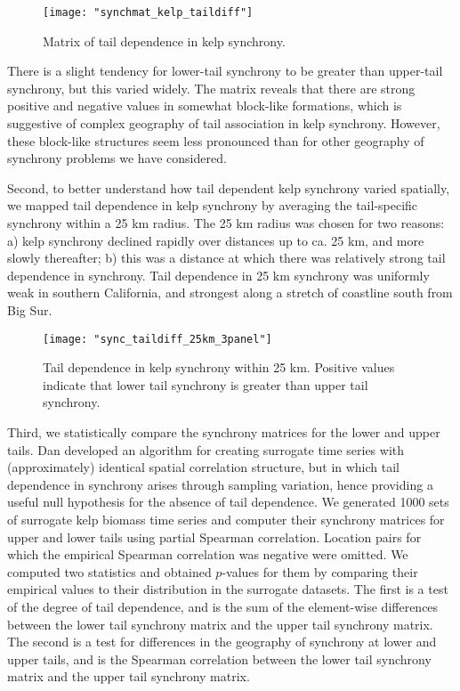 \documentclass[12pt, oneside]{article}
\begin{document}
\begin{figure}
   \centering
   \texttt{[image: "synchmat\_kelp\_taildiff"]}
   \caption{Matrix of tail dependence in kelp synchrony.}
   \label{fig:synchmat}
\end{figure}

There is a slight tendency for lower-tail synchrony to be greater than upper-tail synchrony, but this varied widely.
The matrix reveals that there are strong positive and negative values in somewhat block-like formations, which is suggestive of complex geography of tail association in kelp synchrony.
However, these block-like structures seem less pronounced than for other geography of synchrony problems we have considered.

Second, to better understand how tail dependent kelp synchrony varied spatially, we mapped tail dependence in kelp synchrony by averaging the tail-specific synchrony within a 25 km radius.
The 25 km radius was chosen for two reasons: a) kelp synchrony declined rapidly over distances up to ca. 25 km, and more slowly thereafter; b) this was a distance at which there was relatively strong tail dependence in synchrony. 
Tail dependence in 25 km synchrony was uniformly weak in southern California, and strongest along a stretch of coastline south from Big Sur. 

\begin{figure}
    \centering
    \texttt{[image: "sync\_taildiff\_25km\_3panel"]}
    \caption{Tail dependence in kelp synchrony within 25 km. Positive values indicate that lower tail synchrony is greater than upper tail synchrony.}
    \label{fig:taildiff_25km}
\end{figure}


Third, we statistically compare the synchrony matrices for the lower and upper tails.
Dan developed an algorithm for creating surrogate time series with (approximately) identical spatial correlation structure, but in which tail dependence in synchrony arises through sampling variation, hence providing a useful null hypothesis for the absence of tail dependence.
We generated 1000 sets of surrogate kelp biomass time series and computer their synchrony matrices for upper and lower tails using partial Spearman correlation.
Location pairs for which the empirical Spearman correlation was negative were omitted.
We computed two statistics and obtained $p$-values for them by comparing their empirical values to their distribution in the surrogate datasets.
The first is a test of the degree of tail dependence, and is the sum of the element-wise differences between the lower tail synchrony matrix and the upper tail synchrony matrix.
The second is a test for differences in the geography of synchrony at lower and upper tails, and is the Spearman correlation between the lower tail synchrony matrix and the upper tail synchrony matrix.
\end{document}
